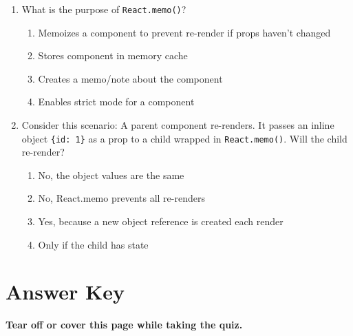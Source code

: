 \documentclass[12pt,a4paper]{article}
\begin{document}
\begin{enumerate}
\item What is the purpose of \texttt{React.memo()}?
\begin{enumerate}[label=\Alph*)]
    \item Memoizes a component to prevent re-render if props haven't changed
    \item Stores component in memory cache
    \item Creates a memo/note about the component
    \item Enables strict mode for a component
\end{enumerate}

\item Consider this scenario: A parent component re-renders. It passes an inline object \texttt{\{id: 1\}} as a prop to a child wrapped in \texttt{React.memo()}. Will the child re-render?
\begin{enumerate}[label=\Alph*)]
    \item No, the object values are the same
    \item No, React.memo prevents all re-renders
    \item Yes, because a new object reference is created each render
    \item Only if the child has state
\end{enumerate}

\end{enumerate}

\newpage
\section*{Answer Key}

\begin{center}
\textbf{Tear off or cover this page while taking the quiz.}
\end{center}

\vspace{1cm}
\end{document}
